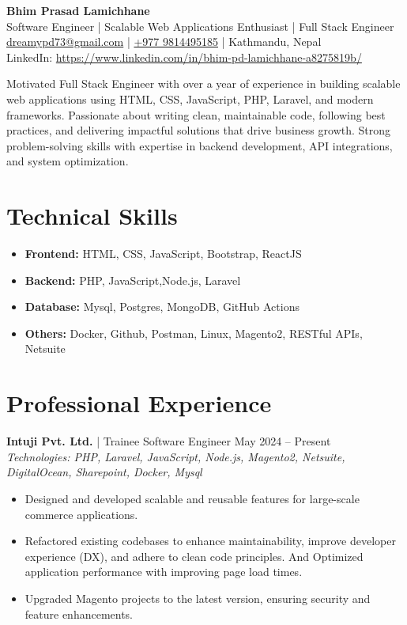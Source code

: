 \documentclass[a4paper,10pt]{article}
\begin{document}
\begin{center}
    {\LARGE \textbf{Bhim Prasad Lamichhane}} \\[0.5em]
    \small {Software Engineer} | Scalable Web Applications Enthusiast | Full Stack Engineer \\[0.5em]
    \href{mailto:infoujjwalbhandari@gmail.com}{dreamypd73@gmail.com} | 
    \href{tel:+9779864431748}{+977 9814495185} | Kathmandu, Nepal \\[0.5em]
    LinkedIn: \href{https://www.linkedin.com/in/bhim-pd-lamichhane-a8275819b/}{https://www.linkedin.com/in/bhim-pd-lamichhane-a8275819b/}
\end{center}


\noindent Motivated Full Stack Engineer with over a year of experience in building scalable web applications using HTML, CSS, JavaScript, PHP, Laravel, and modern frameworks. Passionate about writing clean, maintainable code, following best practices, and delivering impactful solutions that drive business growth. Strong problem-solving skills with expertise in backend development, API integrations, and system optimization.



\section*{Technical Skills}
\begin{itemize}
    \item \textbf{Frontend:} HTML, CSS, JavaScript, Bootstrap, ReactJS
    \item \textbf{Backend:} PHP, JavaScript,Node.js, Laravel
    \item \textbf{Database:} Mysql, Postgres, MongoDB, GitHub Actions
    \item \textbf{Others:} Docker, Github, Postman, Linux, Magento2, RESTful APIs, Netsuite
\end{itemize}

\section*{Professional Experience}
\textbf{Intuji Pvt. Ltd.} | Trainee Software Engineer \hfill May 2024 -- Present \\
\textit{Technologies: PHP, Laravel, JavaScript, Node.js, Magento2, Netsuite, DigitalOcean, Sharepoint, Docker, Mysql}

\begin{itemize}
    \item Designed and developed scalable and reusable features for large-scale commerce applications.
    \item Refactored existing codebases to enhance maintainability, improve developer experience (DX), and adhere to clean code principles. And Optimized application performance with improving page load times.
    \item Upgraded Magento projects to the latest version, ensuring security and feature enhancements.



\end{itemize}
\end{document}
